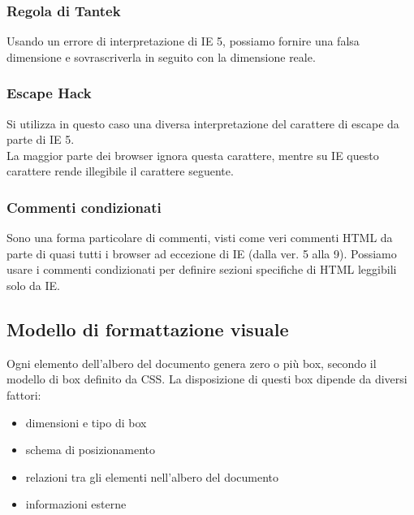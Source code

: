 \documentclass{article}
\begin{document}
\subsubsection{Regola di Tantek}
Usando un errore di interpretazione di IE 5, possiamo fornire una falsa dimensione e sovrascriverla in seguito con la dimensione reale.
\subsubsection{Escape Hack}
Si utilizza in questo caso una diversa interpretazione del carattere di escape da parte di IE 5.\\
La maggior parte dei browser ignora questa carattere, mentre su IE questo carattere rende illegibile il carattere seguente.
\subsubsection{Commenti condizionati}
Sono una forma particolare di commenti, visti come veri commenti HTML da parte di quasi tutti i browser ad eccezione di IE (dalla ver. 5 alla 9). Possiamo usare i commenti condizionati per definire sezioni specifiche di HTML leggibili solo da IE.
\subsection{Modello di formattazione visuale}
Ogni elemento dell'albero del documento genera zero o più box, secondo il modello di box definito da CSS. La disposizione di questi box dipende da diversi fattori:
\begin{itemize}
	\item dimensioni e tipo di box
	\item schema di posizionamento
	\item relazioni tra gli elementi nell'albero del documento
	\item informazioni esterne
\end{itemize}
\end{document}
